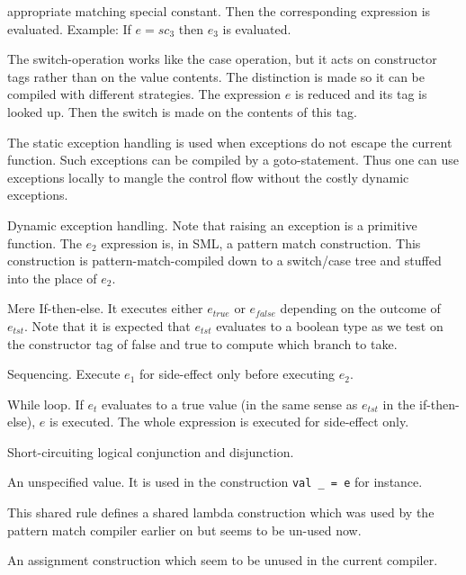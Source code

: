 \documentclass[a4paper, oneside, 10pt, draft]{memoir}
\begin{document}
\begin{description}
  appropriate matching special constant. Then the corresponding
  expression is evaluated. Example: If $e = sc_3$ then $e_3$ is
  evaluated.
\item[$\<switch>(a)\; e \<of> bt_1 \Rightarrow e_1, \; bt_2
  \Rightarrow e_2, \; \dotsc$] The switch-operation works like the
  case operation, but it acts on constructor tags rather than on the
  value contents. The distinction is made so it can be compiled with
  different strategies. The expression
  $e$ is reduced and its tag is looked up. Then the switch is made on
  the contents of this tag.
\item[$b& \<sfail>, e_1 \<shandle> e_2$] The static exception handling
  is used when exceptions do not escape the current function. Such
  exceptions can be compiled by a goto-statement. Thus one can use
  exceptions locally to mangle the control flow without the costly
  dynamic exceptions.
\item[$e_1 \<handle> e_2$] Dynamic exception handling. Note that
  raising an exception is a primitive function. The $e_2$ expression
  is, in SML, a pattern match construction. This construction is
  pattern-match-compiled down to a switch/case tree and stuffed into
  the place of $e_2$.
\item[$\<if> e_{tst} \<then> e_{true} \<else> e_{false}$] Mere
  If-then-else. It executes either $e_{true}$ or $e_{false}$ depending
  on the outcome of $e_{tst}$. Note that it is expected that $e_{tst}$
  evaluates to a boolean type as we test on the constructor tag of
  false and true to compute which branch to take.
\item[$e_1; \; e_2$] Sequencing. Execute $e_1$ for side-effect only
  before executing $e_2$.
\item[$\<while> e_t \<do> e$] While loop. If $e_t$ evaluates to a true
  value (in the same sense as $e_{tst}$ in the if-then-else), $e$ is
  executed. The whole expression is executed for side-effect only.
\item[$e \<andalso> e, e \<orelse> e$] Short-circuiting logical
  conjunction and disjunction.
\item[$unspec$] An unspecified value. It is used in the construction
  \texttt{val \_ = e} for instance.
\item[$\<shared>(k) \; e^{*}$] This shared rule defines a shared
  lambda construction which was used by the pattern match compiler
  earlier on but seems to be un-used now.
\item[$\<assign> i \leftarrow e$] An assignment construction which
  seem to be unused in the current compiler.
\end{description}
\end{document}
